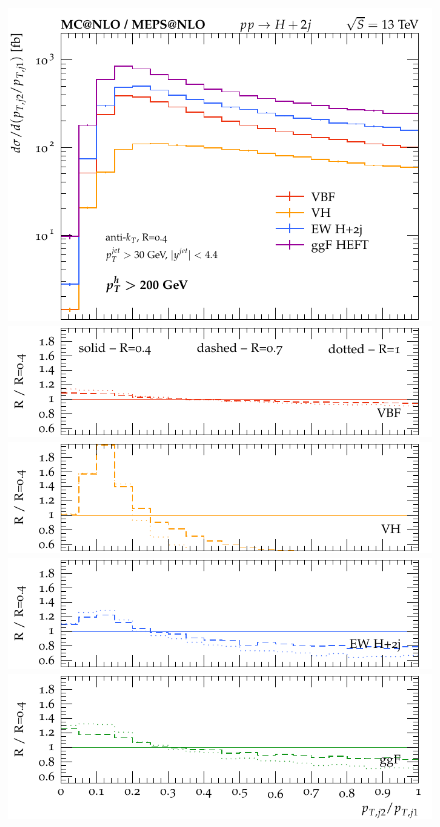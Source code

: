 \documentclass[10pt,prd,fleqn,superscriptaddress,notitlepage,nofootinbib,preprintnumbers,nobalancelastpage]{revtex4-1}
\begin{document}
\begin{figure}[p]
\begin{minipage}{.2925\textwidth}
  \end{minipage}\hfill
  \begin{minipage}{.2925\textwidth}
    \includegraphics[width=\textwidth]{figures/channels/pt2_pt1_pth200.pdf}
    \includegraphics[width=\textwidth]{figures/channels/pt2_pt1_pth200_rVBF.pdf}
    \includegraphics[width=\textwidth]{figures/channels/pt2_pt1_pth200_rVH.pdf}
    \includegraphics[width=\textwidth]{figures/channels/pt2_pt1_pth200_rHJJ.pdf}
    \includegraphics[width=\textwidth]{figures/channels/pt2_pt1_pth200_rGGH.pdf}

\end{minipage}
\end{figure}
\end{document}
